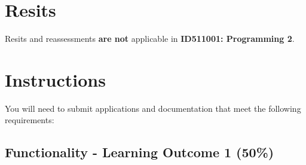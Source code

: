 \documentclass{article}
\begin{document}
\section*{Resits}
Resits and reassessments \textbf{are not} applicable in \textbf{ID511001: Programming 2}.

\section*{Instructions}
You will need to submit applications and documentation that meet the following requirements:\\

\subsection*{Functionality - Learning Outcome 1 (50\%)}
\end{document}
